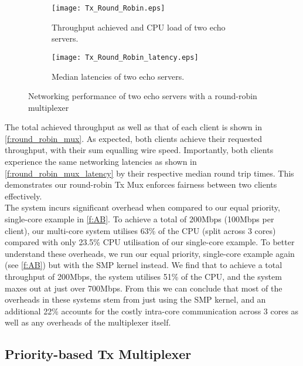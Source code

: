 \noindent\begin{figure}[H]
    \centering
	\begin{multicols}{2}
		\begin{subfigure}[b]{0.45\textwidth}
        \centering
        \texttt{[image: Tx\_Round\_Robin.eps]}
        \caption{Throughput achieved and CPU load of two echo servers.}
        \label{f:round_robin_mux}
    \end{subfigure}\qquad
    \begin{subfigure}[b]{0.45\textwidth}
        \vspace{52pt}
        \centering
        \texttt{[image: Tx\_Round\_Robin\_latency.eps]}
        \vspace{0.5pt}
        \caption{Median latencies of two echo servers.}
        \label{f:round_robin_mux_latency}
    \end{subfigure}
\end{multicols}
\caption{Networking performance of two echo servers with a round-robin multiplexer}
\end{figure}

The total achieved throughput as well as that of each client is shown in \autoref{f:round_robin_mux}. As expected, both clients achieve their 
requested throughput, with their sum equalling wire speed. Importantly, both clients experience the same networking latencies as shown
in \autoref{f:round_robin_mux_latency} by their respective median round trip times. This demonstrates our round-robin Tx Mux enforces
fairness between two clients effectively.\\

The system incurs significant overhead when compared to our equal priority, single-core example in \autoref{f:AB}. To
achieve a total of 200Mbps (100Mbps per client), our multi-core system utilises 63\% of the CPU (split across 3 cores) compared with 
only 23.5\% CPU utilisation of our single-core example. To better understand these overheads, we run our equal priority, 
single-core example again (see \autoref{f:AB}) but with the SMP kernel instead. We find that to achieve
a total throughput of 200Mbps, the system utilises 51\% of the CPU, and the system maxes out at just over 700Mbps. 
From this we can conclude that most of the overheads in these systems stem 
from just using the SMP kernel, and an additional 22\% accounts for the costly intra-core communication across 3 cores as 
well as any overheads of the multiplexer itself. 

\subsection{Priority-based Tx Multiplexer}

